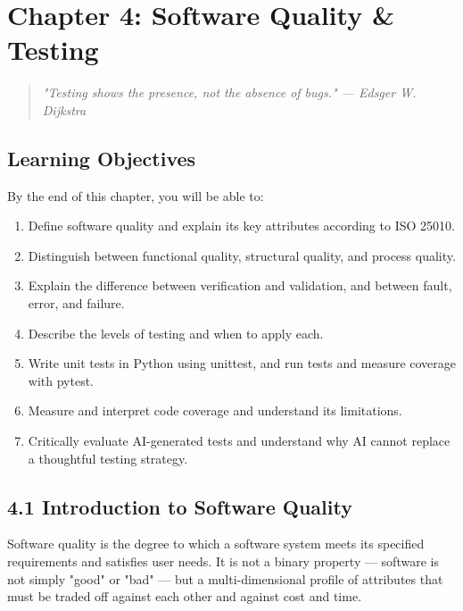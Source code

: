 \documentclass[11pt,a4paper]{book}
\begin{document}

\chapter{Chapter 4: Software Quality \& Testing}

\begin{quote}
\textit{\textit{"Testing shows the presence, not the absence of bugs."} --- Edsger W. Dijkstra}
\end{quote}

\medskip

\section{Learning Objectives}

By the end of this chapter, you will be able to:

\begin{enumerate}
  \item Define software quality and explain its key attributes according to ISO 25010.
  \item Distinguish between functional quality, structural quality, and process quality.
  \item Explain the difference between verification and validation, and between fault, error, and failure.
  \item Describe the levels of testing and when to apply each.
  \item Write unit tests in Python using unittest, and run tests and measure coverage with pytest.
  \item Measure and interpret code coverage and understand its limitations.
  \item Critically evaluate AI-generated tests and understand why AI cannot replace a thoughtful testing strategy.
\end{enumerate}

\medskip

\section{4.1 Introduction to Software Quality}

Software quality is the degree to which a software system meets its specified requirements and satisfies user needs. It is not a binary property --- software is not simply "good" or "bad" --- but a multi-dimensional profile of attributes that must be traded off against each other and against cost and time.
\end{document}

